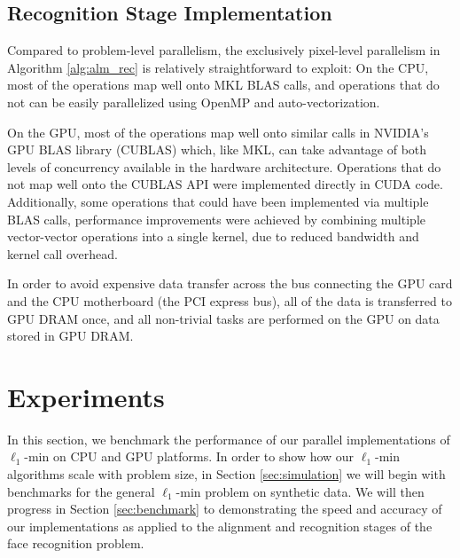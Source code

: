 \documentclass[preprint]{sigplanconf}
\begin{document}
\subsection{Recognition Stage Implementation} \vspace{-0.06in}
Compared to problem-level
parallelism, the exclusively pixel-level parallelism in Algorithm \ref{alg:alm_rec} is
relatively straightforward to exploit:  
On the CPU, most of the operations map
well onto MKL BLAS calls, and operations that do not can be easily
parallelized using OpenMP and auto-vectorization.

On the GPU, most of the operations map well onto similar calls in NVIDIA's GPU
BLAS library (CUBLAS) which, like MKL, can take advantage of both levels of
concurrency available in the hardware architecture.  Operations that do not map
well onto the CUBLAS API were implemented directly in CUDA code.
Additionally, some operations that could have been implemented via multiple
BLAS calls, performance improvements were achieved by combining multiple
vector-vector operations into a single kernel, due to reduced bandwidth and
kernel call overhead.  

In order to avoid expensive data transfer across the bus connecting the GPU
card and the CPU motherboard (the PCI express bus), all of the data is
transferred to GPU DRAM once, and all non-trivial tasks are performed on the
GPU on data stored in GPU DRAM.  

\section{Experiments} \vspace{-0.06in}
\label{sec:experiment} 
In this section, we benchmark the
performance of our parallel implementations of $\ell_1$-min on CPU and GPU
platforms.  In order to show how our $\ell_1$-min algorithms scale with problem
size, in Section \ref{sec:simulation} we will begin with benchmarks for the
general $\ell_1$-min problem on synthetic data.  We will then progress in
Section \ref{sec:benchmark} to demonstrating the speed and accuracy of our
implementations as applied to the alignment and recognition stages of the face
recognition problem.
\end{document}
